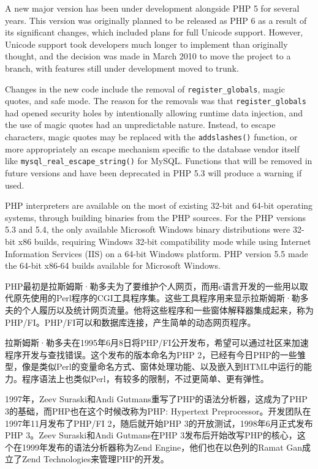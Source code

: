 

A new major version has been under development alongside PHP 5 for several years. This version was originally planned to be released as PHP 6 as a result of its significant changes, which included plans for full Unicode support. However, Unicode support took developers much longer to implement than originally thought, and the decision was made in March 2010 to move the project to a branch, with features still under development moved to trunk.

Changes in the new code include the removal of \texttt{register\_globals}, magic quotes, and safe mode. The reason for the removals was that \texttt{register\_globals} had opened security holes by intentionally allowing runtime data injection, and the use of magic quotes had an unpredictable nature. Instead, to escape characters, magic quotes may be replaced with the \texttt{addslashes()} function, or more appropriately an escape mechanism specific to the database vendor itself like \texttt{mysql\_real\_escape\_string()} for MySQL. Functions that will be removed in future versions and have been deprecated in PHP 5.3 will produce a warning if used.

PHP interpreters are available on the most of existing 32-bit and 64-bit operating systems, through building binaries from the PHP sources. For the PHP versions 5.3 and 5.4, the only available Microsoft Windows binary distributions were 32-bit x86 builds, requiring Windows 32-bit compatibility mode while using Internet Information Services (IIS) on a 64-bit Windows platform. PHP version 5.5 made the 64-bit x86-64 builds available for Microsoft Windows.

PHP最初是拉斯姆斯·勒多夫为了要维护个人网页，而用c语言开发的一些用以取代原先使用的Perl程序的CGI工具程序集。这些工具程序用来显示拉斯姆斯·勒多夫的个人履历以及统计网页流量。他将这些程序和一些窗体解释器集成起来，称为PHP/FI。PHP/FI可以和数据库连接，产生简单的动态网页程序。

拉斯姆斯·勒多夫在1995年6月8日将PHP/FI公开发布，希望可以通过社区来加速程序开发与查找错误。这个发布的版本命名为PHP 2，已经有今日PHP的一些雏型，像是类似Perl的变量命名方式、窗体处理功能、以及嵌入到HTML中运行的能力。程序语法上也类似Perl，有较多的限制，不过更简单、更有弹性。

1997年，Zeev Suraski和Andi Gutmans重写了PHP的语法分析器，这成为了PHP 3的基础，而PHP也在这个时候改称为PHP: Hypertext Preprocessor。开发团队在1997年11月发布了PHP/FI 2，随后就开始PHP 3的开放测试，1998年6月正式发布PHP 3。Zeev Suraski和Andi Gutmans在PHP 3发布后开始改写PHP的核心，这个在1999年发布的语法分析器称为Zend Engine，他们也在以色列的Ramat Gan成立了Zend Technologies来管理PHP的开发。

